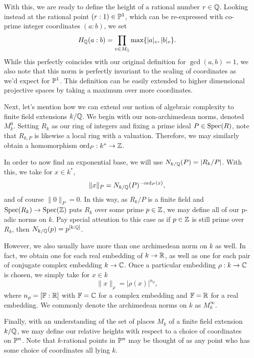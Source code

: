 \documentclass[12pt]{article}
\begin{document}
    With this, we are ready to define the height of a rational number $r \in \mathbb{Q}$. 
    Looking instead at the rational point $(r : 1) \in \mathbb{P}^1$, 
    which can be re-expressed with co-prime integer coordinates $(a : b)$,
    we set 
    \[
        H_{\mathbb{Q}}(a : b) = \prod_{v \in M_{\mathbb{Q}}} \max\{|a|_v, |b|_v\}.
    \]
    While this perfectly coincides with our original definition for $\gcd(a, b) = 1$,
    we also note that this norm is perfectly invariant to the scaling of coordinates as we'd expect for $\mathbb{P}^1$.
    This definition can be easily extended to higher dimensional projective spaces by taking a maximum over more coordinates.

    Next, let's mention how we can extend our notion of algebraic complexity to finite field extensions $k/\mathbb{Q}$.
    We begin with our non-archimedean norms, denoted $M_k^0$.
    Setting $R_k$ as our ring of integers and fixing a prime ideal $P \in {\rm Spec}(R)$, 
    note that $R_{k,P}$ is likewise a local ring with a valuation.
    Therefore, we may similarly obtain a homomorphism ${\rm ord}_P : k^* \to \mathbb{Z}$.

    In order to now find an exponential base,
    we will use $N_{k/\mathbb{Q}}(P) = |R_k / P|$.
    With this, we take for $x \in k^*$,
    \[
        \|x\|_P = N_{k / \mathbb{Q}}(P)^{-{\rm ord}_P(x)},
    \]
    and of course $\|0\|_P = 0$.
    In this way, as $R_k / P$ is a finite field and ${\rm Spec}(R_k) \to {\rm Spec}(\mathbb{Z})$ puts $R_k$ over some prime $p \in \mathbb{Z}$,
    we may define all of our p-adic norms on $k$. 
    Pay special attention to this case as if $p \in \mathbb{Z}$ is still prime over $R_k$,
    then $N_{k / \mathbb{Q}}(p) = p^{[k : \mathbb{Q}]}$.

    However, we also usually have more than one archimedean norm on $k$ as well.
    In fact, we obtain one for each real embedding of $k \to \mathbb{R}$,
    as well as one for each pair of conjugate complex embedding $k \to \mathbb{C}$.
    Once a particular embedding $\rho : k \to \mathbb{C}$ is chosen,
    we simply take for $x \in k$
    \[
        \|x\|_\rho = |\rho(x)|^{n_\rho},
    \]
    where $n_{\rho} = [\mathbb{F} : \mathbb{R}]$ with $\mathbb{F} = \mathbb{C}$ for a complex embedding and $\mathbb{F} = \mathbb{R}$ for a real embedding.
    We commonly denote the archimedean norms on $k$ as $M^\infty_k$.

    Finally, with an understanding of the set of places $M_k$ of a finite field extension $k/\mathbb{Q}$,
    we may define our relative heights with respect to a choice of coordinates on $\mathbb{P}^n$.
    Note that $k$-rational points in $\mathbb{P}^n$ may be thought of as any point who has some choice of coordinates all lying $k$. 
\end{document}
